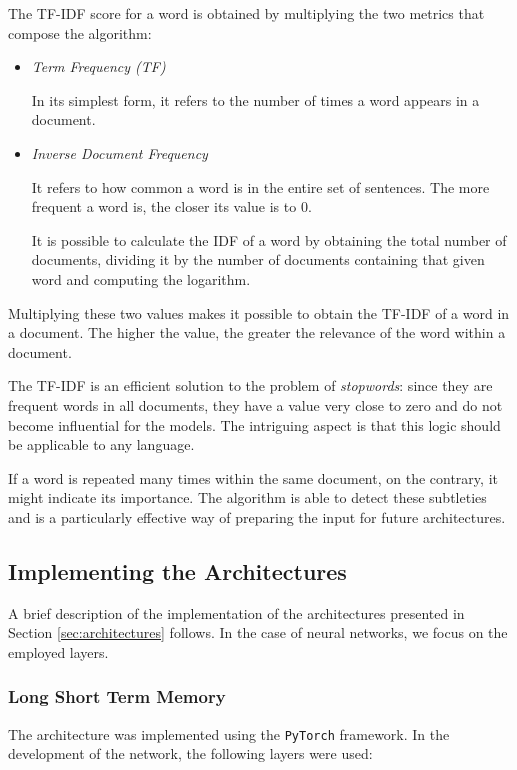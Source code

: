 \documentclass[letterpaper,11pt]{article}
\begin{document}
The TF-IDF score for a word is obtained by multiplying the two metrics that compose the algorithm:

\begin{itemize}
  \item \textit{Term Frequency (TF)}
  
  In its simplest form, it refers to the number of times a word appears in a document.

  \item \textit{Inverse Document Frequency}
  
  It refers to how common a word is in the entire set of sentences. The more frequent a word is, the closer its value is to 0.

  It is possible to calculate the IDF of a word by obtaining the total number of documents, dividing it by the number of documents containing that given word and computing the logarithm.
\end{itemize}

Multiplying these two values makes it possible to obtain the TF-IDF of a word in a document. The higher the value, the greater the relevance of the word within a document.

The TF-IDF is an efficient solution to the problem of \textit{stopwords}: since they are frequent words in all documents, they have a value very close to zero and do not become influential for the models. The intriguing aspect is that this logic should be applicable to any language.

If a word is repeated many times within the same document, on the contrary, it might indicate its importance. The algorithm is able to detect these subtleties and is a particularly effective way of preparing the input for future architectures.


\subsection{Implementing the Architectures}
\label{subsec:implementation}

A brief description of the implementation of the architectures presented in Section \ref{sec:architectures} follows. In the case of neural networks, we focus on the employed layers.

\subsubsection*{Long Short Term Memory}

The architecture was implemented using the \verb|PyTorch| framework. 
In the development of the network, the following layers were used:
\end{document}
